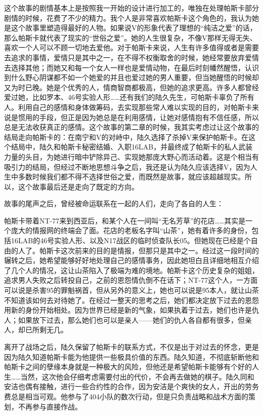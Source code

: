 这个故事的剧情基本上是按照我一开始的设计进行加工的，唯独在处理帕斯卡部分剧情的时候，花费了不少的精力。我个人是非常喜欢帕斯卡这个角色的，我认为她是这个故事里塑造得最好的人物。如果说V的形象代表了理想的“纯洁之爱”的话，那么帕斯卡就代表了现实的“世俗之爱”。她的人生很复杂，不像V那样无得无失、喜欢一个人可以不顾一切地去爱他。对于帕斯卡来说，人生有许多值得或者是需要去追求的事情，爱情只是其中之一，在不得不权衡取舍的时候，她经常要放弃爱情去选择其他；而她又和每一个女人一样也是爱情动物，在最后时刻幡然醒悟，认识到什么野心阴谋都不如一个她爱的并且也爱过她的男人重要，但当她醒悟的时候却又为时已晚。她是个优秀的人，情商智商都极高，但她的追求更高。许多人都曾经爱过她，比如罗本、46号实验人形……还有我们的陆久先生，可帕斯卡辜负了所有人。利用自己的感情和身体做筹码，去实现那些常人难以实现的目的，对帕斯卡来说是惯用的手段，但正是因为她总是在利用感情，让她对感情抱有不信任感，所以总是无法收获真正的感情。这个故事的第二章的时候，我其实考虑过让这个故事的结局走向帕斯卡的：在南宁和V的对峙中，陆久选择了杀掉V来保护帕斯卡。在这个结局中，陆久和帕斯卡秘密结婚、入职16LAB，并最终成了帕斯卡的私人武装力量的头目，为她进行暗中铲除异己、实现她那庞大野心而活动着。这是个相当有吸引力的结局，但经过不断地思想斗争之后，我还是认为陆久应该选择V，因为人生中多数时候我们都不得不选择世俗之爱，而既然是故事，就应该超越现实。所以，这个故事最后还是走向了既定的方向。

故事的尾声之后，曾经被命运联系在一起的人们，走向了各自的人生：

帕斯卡带着NT-77来到西亚后，和某个人在一间叫“无名芳草”的花店……其实是一个庞大的情报网的终端会了面。花店的老板名字叫“山茶”，她有着许多的身份，包括16LAB的46号实验人形、以及N17战区的临时侦查队长05。但她现在已经是个自由的人了。帕斯卡这次前来的目的是情报，但那只是其中之一。经过这一段时间的辗转之后，她希望能够好好地处理自己的感情事务，因此她坦白且详细地相互介绍了几个人的情况，这让山茶陷入了极端为难的境地。帕斯卡这个历史复杂的姐姐，追求男人失败之后转投自己，之前的恩怨情仇倒不在话下；NT-77这个人，一方面可以说是杀害95的罪魁祸首，但从另外的意义上，她也可以说是95本人，就让山茶不知道该如何去对待她了。在经过一整天的思考之后，她们都决定放下过去的恩怨用新的身份开始相处。因为世界已经是新的气象，如果执着于过去，她们也许是仇人；如果放下过去，那么她们也可以是亲人——她们的仇人各自都有很多，但亲人，却已所剩无几。

离开了战场之后，陆久保留了帕斯卡的联系方式，不仅是出于对过去的怀念，更是因为陆久知道帕斯卡能为他提供一些极具价值的东西。陆久知道，不彻底斩断他和帕斯卡之间的孽缘本身就是一种极大的风险，但他还是希望帕斯卡能够有个好的人生……当然，这次他会仔细考虑需要付出的代价，不会再去做她的棋子。陆久同和安洁也偶有接触，进行一些合约性的合作，因为安洁是个爽快的女人，开出的劳务费总是相当可观。他参与了404小队的数次行动，但是只负责战略和战术方面的策划，不再参与直接作战。

